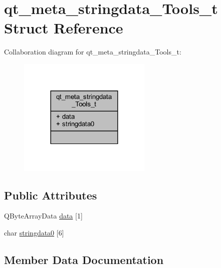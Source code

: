 \hypertarget{structqt__meta__stringdata___tools__t}{}\section{qt\+\_\+meta\+\_\+stringdata\+\_\+\+Tools\+\_\+t Struct Reference}
\label{structqt__meta__stringdata___tools__t}


Collaboration diagram for qt\+\_\+meta\+\_\+stringdata\+\_\+\+Tools\+\_\+t\+:
\nopagebreak
\begin{figure}[H]
\begin{center}
\leavevmode
\includegraphics[width=180pt]{structqt__meta__stringdata___tools__t__coll__graph}
\end{center}
\end{figure}
\subsection*{Public Attributes}
\begin{DoxyCompactItemize}
\item 
Q\+Byte\+Array\+Data \mbox{\hyperlink{structqt__meta__stringdata___tools__t_a93160e292da8b47f415352f417686c0e}{data}} \mbox{[}1\mbox{]}
\item 
char \mbox{\hyperlink{structqt__meta__stringdata___tools__t_a5bc504d522d8c0a46a719adc4409156a}{stringdata0}} \mbox{[}6\mbox{]}
\end{DoxyCompactItemize}


\subsection{Member Data Documentation}
\mbox{\label{structqt__meta__stringdata___tools__t_a93160e292da8b47f415352f417686c0e}} 
